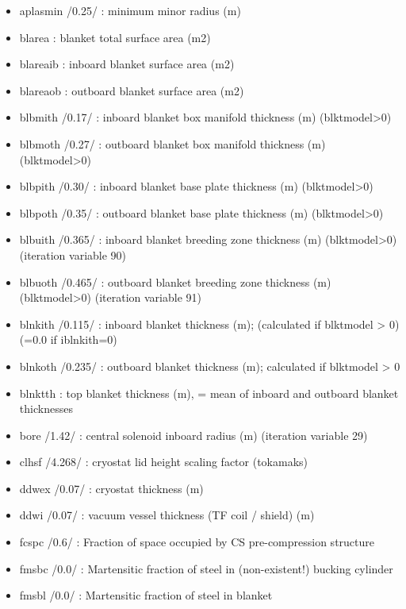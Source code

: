 \documentclass[
]{article}
\providecommand{\tightlist}{%
  \setlength{\itemsep}{0pt}\setlength{\parskip}{0pt}}
\begin{document}
\begin{itemize}
  \begin{itemize}
  \tightlist
  \item
    aplasmin /0.25/ : minimum minor radius (m)
  \item
    blarea : blanket total surface area (m2)
  \item
    blareaib : inboard blanket surface area (m2)
  \item
    blareaob : outboard blanket surface area (m2)
  \item
    blbmith /0.17/ : inboard blanket box manifold thickness (m)
    (blktmodel\textgreater0)
  \item
    blbmoth /0.27/ : outboard blanket box manifold thickness (m)
    (blktmodel\textgreater0)
  \item
    blbpith /0.30/ : inboard blanket base plate thickness (m)
    (blktmodel\textgreater0)
  \item
    blbpoth /0.35/ : outboard blanket base plate thickness (m)
    (blktmodel\textgreater0)
  \item
    blbuith /0.365/ : inboard blanket breeding zone thickness (m)
    (blktmodel\textgreater0) (iteration variable 90)
  \item
    blbuoth /0.465/ : outboard blanket breeding zone thickness (m)
    (blktmodel\textgreater0) (iteration variable 91)
  \item
    blnkith /0.115/ : inboard blanket thickness (m); (calculated if
    blktmodel \textgreater{} 0) (=0.0 if iblnkith=0)
  \item
    blnkoth /0.235/ : outboard blanket thickness (m); calculated if
    blktmodel \textgreater{} 0
  \item
    blnktth : top blanket thickness (m), = mean of inboard and outboard
    blanket thicknesses
  \item
    bore /1.42/ : central solenoid inboard radius (m) (iteration
    variable 29)
  \item
    clhsf /4.268/ : cryostat lid height scaling factor (tokamaks)
  \item
    ddwex /0.07/ : cryostat thickness (m)
  \item
    ddwi /0.07/ : vacuum vessel thickness (TF coil / shield) (m)
  \item
    fcspc /0.6/ : Fraction of space occupied by CS pre-compression
    structure
  \item
    fmsbc /0.0/ : Martensitic fraction of steel in (non-existent!)
    bucking cylinder
  \item
    fmsbl /0.0/ : Martensitic fraction of steel in blanket

\end{itemize}
\end{itemize}
\end{document}
